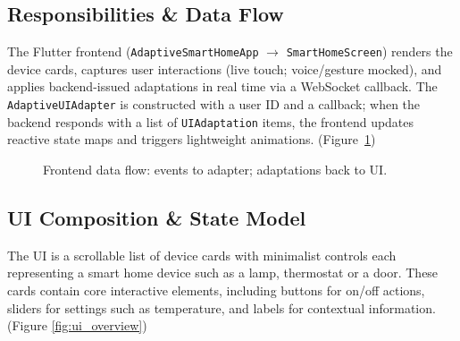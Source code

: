 \subsection{Responsibilities \& Data Flow}
The Flutter frontend (\texttt{AdaptiveSmartHomeApp} $\rightarrow$ \texttt{SmartHomeScreen}) renders the device cards, captures user interactions (live touch; voice/gesture mocked), and applies backend-issued adaptations in real time via a WebSocket callback. The \texttt{AdaptiveUIAdapter} is constructed with a user ID and a callback; when the backend responds with a list of \texttt{UIAdaptation} items, the frontend updates reactive state maps and triggers lightweight animations. (Figure~\ref{fig:frontend_data_flow})

\begin{figure}[h]
\centering
{}
\caption{Frontend data flow: events to adapter; adaptations back to UI.}
\label{fig:frontend_data_flow}
\end{figure}

\subsection{UI Composition \& State Model}
The UI is a scrollable list of device cards with minimalist controls each representing a smart home device such as a lamp, thermostat or a door. These cards contain core interactive elements, including buttons for on/off actions, sliders for settings such as temperature, and labels for contextual information. (Figure \ref{fig:ui_overview})

